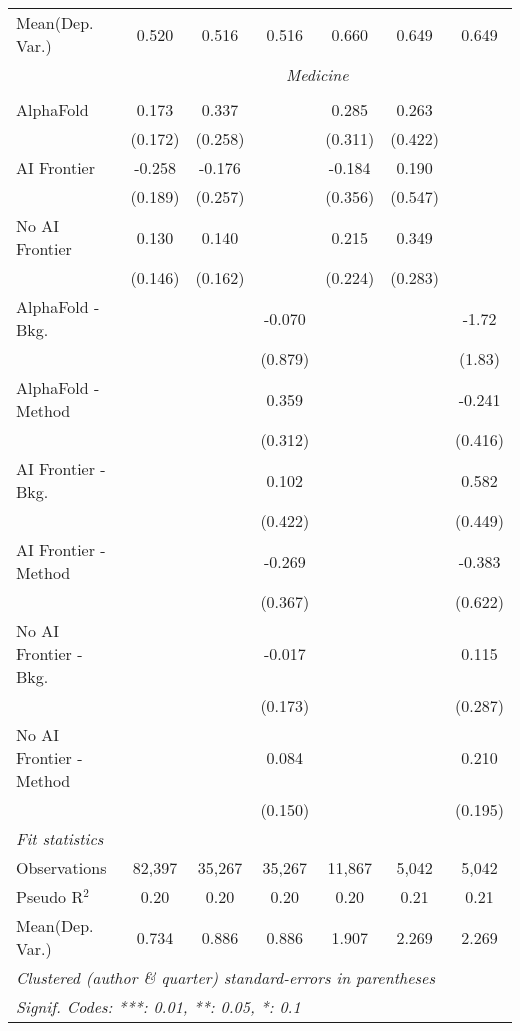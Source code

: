 \begin{tabular}{lcccccc}
Mean(Dep. Var.) & 0.520 & 0.516 & 0.516 & 0.660 & 0.649 & 0.649 \\
 & \multicolumn{6}{c}{\textit{Medicine}} \\ \\
   AlphaFold               & 0.173   & 0.337   &         & 0.285   & 0.263   &   \\   
                           & (0.172) & (0.258) &         & (0.311) & (0.422) &   \\   
   AI Frontier             & -0.258  & -0.176  &         & -0.184  & 0.190   &   \\   
                           & (0.189) & (0.257) &         & (0.356) & (0.547) &   \\   
   No AI Frontier          & 0.130   & 0.140   &         & 0.215   & 0.349   &   \\   
                           & (0.146) & (0.162) &         & (0.224) & (0.283) &   \\   
   AlphaFold - Bkg.        &         &         & -0.070  &         &         & -1.72\\   
                           &         &         & (0.879) &         &         & (1.83)\\   
   AlphaFold - Method      &         &         & 0.359   &         &         & -0.241\\   
                           &         &         & (0.312) &         &         & (0.416)\\   
   AI Frontier - Bkg.      &         &         & 0.102   &         &         & 0.582\\   
                           &         &         & (0.422) &         &         & (0.449)\\   
   AI Frontier - Method    &         &         & -0.269  &         &         & -0.383\\   
                           &         &         & (0.367) &         &         & (0.622)\\   
   No AI Frontier - Bkg.   &         &         & -0.017  &         &         & 0.115\\   
                           &         &         & (0.173) &         &         & (0.287)\\   
   No AI Frontier - Method &         &         & 0.084   &         &         & 0.210\\   
                           &         &         & (0.150) &         &         & (0.195)\\   
   \midrule
   \emph{Fit statistics}\\
   Observations            & 82,397  & 35,267  & 35,267  & 11,867  & 5,042   & 5,042\\  
   Pseudo R$^2$            & 0.20    & 0.20    & 0.20    & 0.20    & 0.21    & 0.21\\  
Mean(Dep. Var.) & 0.734 & 0.886 & 0.886 & 1.907 & 2.269 & 2.269 \\
   \midrule \midrule
   \multicolumn{7}{l}{\emph{Clustered (author \& quarter) standard-errors in parentheses}}\\
   \multicolumn{7}{l}{\emph{Signif. Codes: ***: 0.01, **: 0.05, *: 0.1}}\\
\end{tabular}
\par\endgroup
